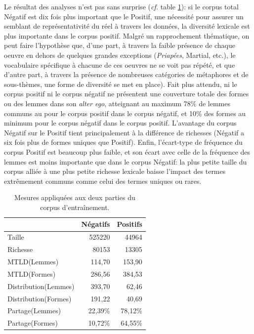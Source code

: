 Le résultat des analyses n'est pas sans surprise (\textit{cf.} table \ref{tab:chap4:mesures-corpora}): si le corpus total Négatif est dix fois plus important que le Positif, une nécessité pour assurer un semblant de représentativité du réel à travers les données, la diversité lexicale est plus importante dans le corpus positif. Malgré un rapprochement thématique, on peut faire l'hypothèse que, d'une part, à travers la faible présence de chaque oeuvre en dehors de quelques grandes exceptions (\textit{Priapées}, Martial, etc.), le vocabulaire spécifique à chacune de ces oeuvres ne se voit pas répété, et que d'autre part, à travers la présence de nombreuses catégories de métaphores et de sous-thèmes, une forme de diversité se met en place). Fait plus attendu, ni le corpus positif ni le corpus négatif ne présentent une couverture totale des formes ou des lemmes dans son \textit{alter ego}, atteignant au maximum 78\% de lemmes communs au pour le corpus positif dans le corpus négatif, et 10\% des formes au minimum pour le corpus négatif dans le corpus positif. L'avantage du corpus Négatif sur le Positif tient principalement à la différence de richesses (Négatif a six fois plus de formes uniques que Positif). Enfin, l'écart-type de fréquence du corpus Positif est beaucoup plus faible, et son écart avec celle de la fréquence des lemmes est moins importante que dans le corpus Négatif: la plus petite taille du corpus alliée à une plus petite richesse lexicale baisse l'impact des termes extrêmement communs comme celui des termes uniques ou rares.

\begin{table}[ht]
    \centering
    \begin{tabular}{l|rr}
    \toprule
    {} &  Négatifs &  Positifs \\
    \midrule
    Taille               & 525220    &  44964    \\
    Richesse             &  80153    &  13305    \\
    MTLD(Lemmes)         &    114,70 &    153,90 \\
    MTLD(Formes)         &    286,56 &    384,53 \\
    Distribution(Lemmes) &    393,70 &     62,46 \\
    Distribution(Formes) &    191,22 &     40,69 \\
    Partage(Lemmes)      &   22,39\% &   78,12\% \\
    Partage(Formes)      &   10,72\% &   64,55\% \\
    \bottomrule
    \end{tabular}
    \caption{Mesures appliquées aux deux parties du corpus d'entraînement.}
    \label{tab:chap4:mesures-corpora}
\end{table}

